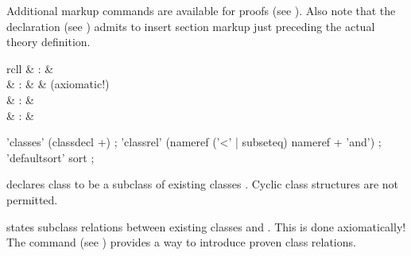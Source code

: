 \begin{isabellebody}
\begin{isamarkuptext}
  \medskip Additional markup commands are available for proofs (see
  ).  Also note that the \mbox{} declaration (see ) admits to insert
  section markup just preceding the actual theory definition.%
\end{isamarkuptext}%
\isamarkuptrue%
%
\isamarkuptrue%
%
\begin{isamarkuptext}%
\begin{matharray}{rcll}
    \mbox{} & : &  \\
    \mbox{} & : &  & (axiomatic!) \\
    \mbox{} & : &  \\
    \mbox{} & : &  \\
  \end{matharray}

  \begin{rail}
    'classes' (classdecl +)
    ;
    'classrel' (nameref ('<' | subseteq) nameref + 'and')
    ;
    'defaultsort' sort
    ;
  \end{rail}

  \begin{descr}

  \item [\mbox{\isa{\isacommand{classes}}}~\isa{{\isachardoublequote}c\ {\isasymsubseteq}\ c\isactrlsub {\isadigit{1}}{\isacharcomma}\ {\isasymdots}{\isacharcomma}\ c\isactrlsub n{\isachardoublequote}}]
  declares class  to be a subclass of existing classes .  Cyclic class structures are not permitted.

  \item [\mbox{\isa{\isacommand{classrel}}}~\isa{{\isachardoublequote}c\isactrlsub {\isadigit{1}}\ {\isasymsubseteq}\ c\isactrlsub {\isadigit{2}}{\isachardoublequote}}] states
  subclass relations between existing classes  and
  .  This is done axiomatically!  The \mbox{} command (see ) provides a way to
  introduce proven class relations.


\end{descr}
\end{isamarkuptext}
\end{isabellebody}
